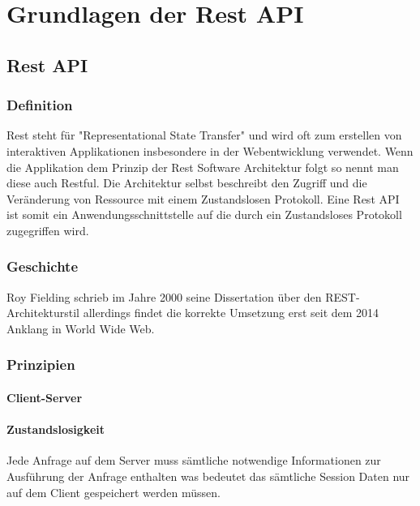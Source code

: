 \chapter{Grundlagen der Rest API}
\bauer

	
	\section{Rest API}
		
		\subsection{Definition}
			Rest steht für "Representational State Transfer" und wird oft zum erstellen von interaktiven Applikationen insbesondere in der Webentwicklung verwendet. Wenn die Applikation dem Prinzip der Rest Software Architektur folgt so nennt man diese auch Restful. Die Architektur selbst beschreibt den Zugriff und die Veränderung von Ressource mit einem Zustandslosen Protokoll. Eine Rest API ist somit ein Anwendungsschnittstelle auf die durch ein Zustandsloses Protokoll zugegriffen wird.
			
		 \subsection{Geschichte}
		 	Roy Fielding schrieb im Jahre 2000 seine Dissertation über den REST-Architekturstil allerdings findet die korrekte Umsetzung erst seit dem 2014 Anklang in World Wide Web.
		 	
		 \subsection{Prinzipien}
		 	
		 	\subsubsection{Client-Server}
		 		
		 	
		 	\subsubsection{Zustandslosigkeit}
		 		Jede Anfrage auf dem Server muss sämtliche notwendige Informationen zur Ausführung der Anfrage enthalten was bedeutet das sämtliche Session Daten nur auf dem Client gespeichert werden müssen.
		 	
